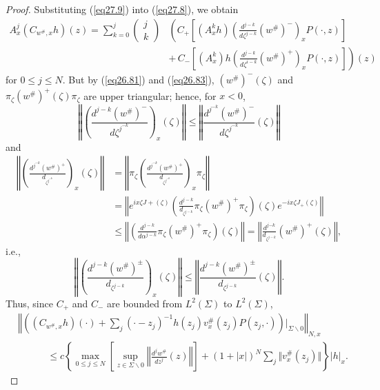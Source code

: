 \documentclass{surv-l}
\theoremstyle{plain}
\theoremstyle{definition}
\numberwithin{equation}{chapter}
\begin{document}
\begin{proof}
Substituting (\ref{eq27.9}) into (\ref{eq27.8}), we obtain
\begin{align}\label{eq27.10}
A_{x}^{j}(C_{w^{\#},x}h)(z)=\sum_{k=0}^{j} \left(\begin{array}{l}
j\\
k
\end{array}\right)& \left(C_{+}\left[(A_{x}^{k}h) \left(\frac{d^{j-k}}{d{\zeta}^{j-k}}(w^{\#})^{-}\right)_{x}P(\cdot,z)\right]\right.\\ \nonumber
&\left. +\,C_{-}\left[(A_{x}^{k})h\left(\frac{d^{j-k}}{d\zeta^{i-k}}(w^{\#})^{+}\right)_{x}P(\cdot, z)\right]\right)(z)
\end{align}
for $0\leq j\leq N$. But by (\ref{eq26.81}) and (\ref{eq26.83}), $(w^{\#})^{-}(\zeta)$ and $\pi_{\zeta}(w^{\#})^{+}(\zeta)\pi_{\zeta}$ are upper triangular; hence, for $x<0$,
\begin{equation*}
\left\Vert\left(\frac{d^{j-k}(w^{\#})^{-}}{d{\zeta^{j^{-k}}}}\right)_{x}(\zeta)\right\Vert\leq\left\Vert\frac{d^{j^{-k}}(w^{\#})^{-}}{d{\zeta^{j^{-k}}}}(\zeta)\right\Vert
\end{equation*}
and
\begin{align*}
\left\Vert\left(\frac{d^{j^{-k}}(w^{\#})^{+}}{d_{\zeta^{j^{-k}}}}\right)_{x}(\zeta)\right\Vert &=\left\Vert\pi_{\zeta}\left(\frac{d^{j^{-k}}(w^{\#})^{+}}{d_{\zeta^{j^{-k}}}}\right)_{x}\pi_{\zeta}\right\Vert\\
&=\left\Vert e^{ix\zeta{J}+(\zeta)}\left(\frac{d^{j-k}}{d_{\zeta^{j-k}}}\pi_{\zeta}(w^{\#})^{+}\pi_{\zeta}\right)(\zeta)e^{-ix\zeta{J_{+}(\zeta)}}\right\Vert\\
&\leq\left\Vert\left(\frac{d^{j-k}}{d\alpha^{j-k}}\pi_{\zeta}(w^{\#})^{+}\pi_{\zeta}\right)(\zeta)\right\Vert=\left\Vert\frac{d^{j{-k}}}{d_{\zeta^{j-k}}}
(w^{\#})^{+}(\zeta)\right\Vert,
\end{align*}
i.e.,
\begin{equation}\label{eq27.11}
\left\Vert\left(\frac{d^{j-k}(w^{\#})^{\pm}}{d_{\zeta^{j-k}}}\right)_{x}(\zeta)\right\Vert\leq\left\Vert\frac{d^{j-k}(w^{\#})^{\pm}}{d_{\zeta^{j-k}}}(\zeta)\right\Vert.
\end{equation}
Thus, since $C_{+}$ and $C_{-}$ are bounded from $L^{2}(\Sigma)$ to $L^{2}(\Sigma)$,
\begin{align*}
&\left\Vert \left((C_{w^{\#},x}h)(\cdot)+\sum_{j}(\cdot-z_{j})^{-1}h(z_{j})v_{x}^{\#}(z_{j})P(z_{j}, \cdot)\right)\bigg|_{\Sigma\backslash 0}\right\Vert_{N,x}\\
& \qquad\quad\leq c\left\{\max_{0\leq j\leq N}\left[\sup_{z\in\Sigma\backslash 0}\left\Vert\frac{d^{j}w^{\#}}{dz^{j}}(z)\right\Vert\right]+(1+|x|)^{N}\sum_{j}\Vert v_{x}^{\#}(z_{j})\Vert\right\}|h|_{x}.
\end{align*}
\end{proof}
\end{document}

